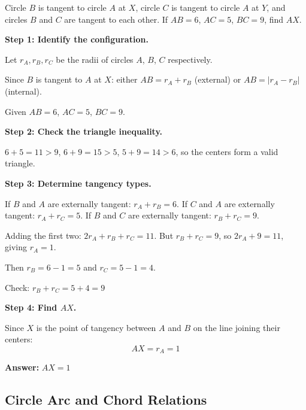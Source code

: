 ﻿\documentclass[12pt]{extarticle}
\begin{document}
Circle $B$ is tangent to circle $A$ at $X$, circle $C$ is tangent to circle $A$ at $Y$, and circles $B$ and $C$ are tangent to each other. If $AB = 6$, $AC = 5$, $BC = 9$, find $AX$.

\begin{solutionbox}
\textbf{Step 1: Identify the configuration.}

Let $r_A, r_B, r_C$ be the radii of circles $A$, $B$, $C$ respectively.

Since $B$ is tangent to $A$ at $X$: either $AB = r_A + r_B$ (external) or $AB = |r_A - r_B|$ (internal).

Given $AB = 6$, $AC = 5$, $BC = 9$.

\textbf{Step 2: Check the triangle inequality.}

$6 + 5 = 11 > 9$, $6 + 9 = 15 > 5$, $5 + 9 = 14 > 6$, so the centers form a valid triangle.

\textbf{Step 3: Determine tangency types.}

If $B$ and $A$ are externally tangent: $r_A + r_B = 6$.
If $C$ and $A$ are externally tangent: $r_A + r_C = 5$.
If $B$ and $C$ are externally tangent: $r_B + r_C = 9$.

Adding the first two: $2r_A + r_B + r_C = 11$.
But $r_B + r_C = 9$, so $2r_A + 9 = 11$, giving $r_A = 1$.

Then $r_B = 6 - 1 = 5$ and $r_C = 5 - 1 = 4$.

Check: $r_B + r_C = 5 + 4 = 9$ \checkmark

\textbf{Step 4: Find $AX$.}

Since $X$ is the point of tangency between $A$ and $B$ on the line joining their centers:
\[AX = r_A = 1\]

\textbf{Answer:} $\boxed{AX = 1}$
\end{solutionbox}

\subsection{Circle Arc and Chord Relations}
\end{document}
